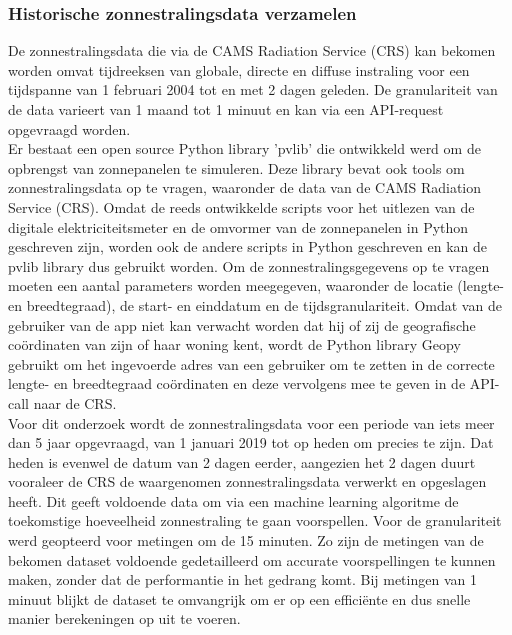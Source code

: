 \subsubsection{Historische zonnestralingsdata verzamelen}

De zonnestralingsdata die via de CAMS Radiation Service (CRS) kan bekomen worden omvat tijdreeksen van globale, directe en diffuse instraling voor een tijdspanne van 1 februari 2004 tot en met 2 dagen geleden. De granulariteit van de data varieert van 1 maand tot 1 minuut en kan via een API-request opgevraagd worden. \\

Er bestaat een open source Python library 'pvlib' \autocite{Jensen2023} die ontwikkeld werd om de opbrengst van zonnepanelen te simuleren. Deze library bevat ook tools om zonnestralingsdata op te vragen, waaronder de data van de CAMS Radiation Service (CRS). Omdat de reeds ontwikkelde scripts voor het uitlezen van de digitale elektriciteitsmeter en de omvormer van de zonnepanelen in Python geschreven zijn, worden ook de andere scripts in Python geschreven en kan de pvlib library dus gebruikt worden. Om de zonnestralingsgegevens op te vragen moeten een aantal parameters worden meegegeven, waaronder de locatie (lengte- en breedtegraad), de start- en einddatum en de tijdsgranulariteit. Omdat van de gebruiker van de app niet kan verwacht worden dat hij of zij de geografische coördinaten van zijn of haar woning kent, wordt de Python library Geopy gebruikt om het ingevoerde adres van een gebruiker om te zetten in de correcte lengte- en breedtegraad  coördinaten en deze vervolgens mee te geven in de API-call naar de CRS. \\

Voor dit onderzoek wordt de zonnestralingsdata voor een periode van iets meer dan 5 jaar opgevraagd, van 1 januari 2019 tot op heden om precies te zijn. Dat heden is evenwel de datum van 2 dagen eerder, aangezien het 2 dagen duurt vooraleer de CRS de waargenomen zonnestralingsdata verwerkt en opgeslagen heeft. Dit geeft voldoende data om via een machine learning algoritme de toekomstige hoeveelheid zonnestraling te gaan voorspellen. Voor de granulariteit werd geopteerd voor metingen om de 15 minuten. Zo zijn de metingen van de bekomen dataset voldoende gedetailleerd om accurate voorspellingen te kunnen maken, zonder dat de performantie in het gedrang komt. Bij metingen van 1 minuut blijkt de dataset te omvangrijk om er op een efficiënte en dus snelle manier berekeningen op uit te voeren.

